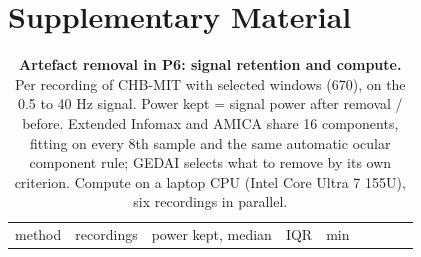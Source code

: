 \documentclass[11pt,a4paper]{article}
\begin{document}
\clearpage
\section*{Supplementary Material}
\setcounter{table}{0}
\renewcommand{\thetable}{S\arabic{table}}
\renewcommand{\theHtable}{S\arabic{table}}
\setcounter{figure}{0}
\renewcommand{\thefigure}{S\arabic{figure}}
\renewcommand{\theHfigure}{S\arabic{figure}}

\begingroup\footnotesize\setlength{\tabcolsep}{3pt}

\begin{longtable}[]{@{}
  >{\raggedright\arraybackslash}p{}
  >{\raggedright\arraybackslash}p{}
  >{\raggedright\arraybackslash}p{}
  >{\raggedright\arraybackslash}p{}
  >{\raggedright\arraybackslash}p{}
  >{\raggedright\arraybackslash}p{}
  >{\raggedright\arraybackslash}p{}
  >{\raggedright\arraybackslash}p{}
  >{\raggedright\arraybackslash}p{}@{}}
\caption{\textbf{Artefact removal in P6: signal retention and compute.} Per recording of CHB-MIT with selected windows (670), on the 0.5 to 40 Hz signal. Power kept = signal power after removal / before. Extended Infomax and AMICA share 16 components, fitting on every 8th sample and the same automatic ocular component rule; GEDAI selects what to remove by its own criterion. Compute on a laptop CPU (Intel Core Ultra 7 155U), six recordings in parallel.}\tabularnewline
\toprule\noalign{}
\begin{minipage}[b]{\linewidth}\raggedright
method
\end{minipage} & \begin{minipage}[b]{\linewidth}\raggedright
recordings
\end{minipage} & \begin{minipage}[b]{\linewidth}\raggedright
power kept, median
\end{minipage} & \begin{minipage}[b]{\linewidth}\raggedright
IQR
\end{minipage} & \begin{minipage}[b]{\linewidth}\raggedright
min
\end{minipage} & \begin{minipage}[b]{\linewidth}\raggedright

\end{minipage}
\end{longtable}
\end{document}
